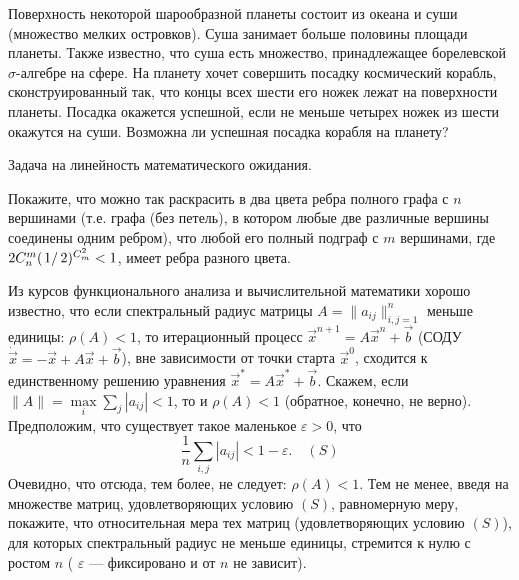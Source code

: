 \begin{problem}
Поверхность некоторой шарообразной планеты состоит из океана и суши (множество мелких островков). Суша занимает больше половины 
площади планеты. Также известно, что суша есть множество, принадлежащее борелевской  $\sigma$-алгебре на сфере. На планету хочет 
совершить посадку космический корабль, сконструированный так, что концы всех шести его ножек лежат на поверхности планеты. 
Посадка окажется успешной, если не меньше четырех ножек из шести окажутся на суши. Возможна ли успешная посадка корабля на планету?
\end{problem}

\begin{ordre}
Задача на линейность математического ожидания.
\end{ordre}





\begin{problem}
Покажите, что можно так раскрасить в два цвета ребра полного графа с $n$ вершинами (т.е. графа (без петель), в котором любые две 
различные вершины соединены одним ребром), что любой его полный подграф с $m$ вершинами, где 
$2C_n^m (\left.1\right/2)^{C_m^2}<1$, имеет ребра разного цвета. 
\end{problem}


\begin{problem}
Из курсов функционального анализа и вычислительной математики хорошо известно, что если спектральный радиус матрицы 
$A=\| a_{ij}\|_{i,j=1}^{n}$ меньше единицы: $\rho(A)<1$, то итерационный процесс ${\vec x}^{n+1}=A{\vec x}^n +{\vec b}$ 
(СОДУ $\dot{\vec x}=-{\vec x}+A{\vec x}+{\vec b}$), вне зависимости от точки старта ${\vec x}^0$, 
сходится к единственному решению уравнения ${\vec x}^*=A{\vec x}^*+{\vec b}$. 
Скажем, если $\| A\|=\max\limits_{i} \sum\limits_j |a_{ij}|<1$, то и $\rho(A)<1$ (обратное, конечно, не верно). Предположим, что 
существует такое маленькое $\varepsilon>0$, что 
$$
\frac{1}{n}\sum\limits_{i,j} |a_{ij}|<1-\varepsilon . 
\quad (S)
$$
Очевидно, что отсюда, тем более, не следует: $\rho(A)<1$. 
Тем не менее, введя на множестве матриц, удовлетворяющих условию $(S)$, равномерную меру, покажите, что относительная мера тех матриц 
(удовлетворяющих условию $(S)$), для которых спектральный радиус не меньше единицы, стремится к нулю 
с ростом $n$ ( $\varepsilon$ --- фиксировано и от $n$ не зависит). 
\end{problem}


